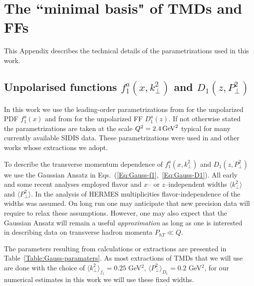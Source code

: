\documentclass[a4paper,11pt]{article}
\newcommand{\la}{\langle}
\newcommand{\ra}{\rangle}
\def\Phperp{P_{hT}}
\def\kperp{k_\perp}
\def\pperp{P_\perp}
\def\avkperp{\la \kperp^2 \ra}
\def\avpperp{\la \pperp^2 \ra}
\begin{document}
 
\newpage
\appendix

\section{\boldmath The ``minimal basis" of TMDs and FFs}
\label{App:basis}

This Appendix describes the technical details of the parametrizations
used in this work.

\subsection{\boldmath Unpolarised functions $f_1^a(x,k_\perp^2)$ 
			and $D_1(z,P_\perp^2)$}
\label{App:basis-f1-D1}

In this work we use the leading-order parametrizations 
from \cite{Martin:2009iq} for the unpolarized PDF $f_1^a(x)$ and 
from \cite{deFlorian:2007aj} for the unpolarized FF $D_1^a(z)$.
If not otherwise stated the parametrizations are taken at the scale 
$Q^2=2.4\,{\rm GeV}^2$ typical for many currently available SIDIS data.
These parametrizations were used in \cite{Anselmino:2005nn} and other 
works whose extractions we adopt. 

To describe the transverse momentum dependence of $f_1^a(x,k_\perp^2)$ 
and $D_1(z,P_\perp^2)$ we use the Gaussian Ansatz in 
Eqs.~(\ref{Eq:Gauss-f1},~\ref{Eq:Gauss-D1}). All early 
\cite{Anselmino:2005nn,Collins:2005ie,D'Alesio:2007jt,Schweitzer:2010tt}
and some recent \cite{Signori:2013mda} analyses employed flavor and 
$x$-- or $z$--independent widths $\avkperp$ and $\avpperp$.
In the analysis \cite{Anselmino:2013lza} 
of HERMES multiplicities flavor-independence of the widths was 
assumed. On long run one may anticipate that new precision data will 
require to relax these assumptions. However, one may also expect that the 
Gaussian Ansatz will remain a useful {\it approximation} as long as one is 
interested in describing data on transverse hadron momenta $\Phperp \ll Q $. 

The parameters resulting from calculations or extractions are presented in
Table~\ref{Table:Gauss-paramaters}. 
As most extractions of TMDs that we will use are done with the choice of 
$\avkperp_{f_1} = 0.25$ GeV$^2$, $\avpperp_{D_1}= 0.2$ GeV$^2$, for our numerical estimates in this work  we will use these fixed widths.
\end{document}
